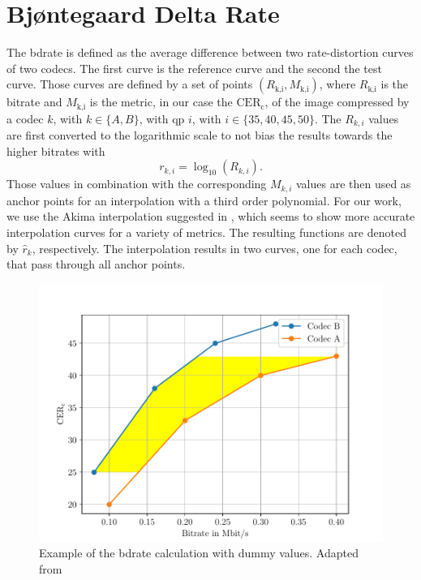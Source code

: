 \section{Bjøntegaard Delta Rate}
\label{subsec:bdrate}

The \gls{bdrate} \cite{bdrate_original_2001}\cite{bdrate_beyond_2022} is defined as the average difference between two rate-distortion curves of two codecs.
The first curve is the reference curve and the second the test curve.
Those curves are defined by a set of points $(R_{\text{k,i}}, M_{\text{k,i}})$, where $R_{\text{k,i}}$ is the bitrate and $M_{\text{k,i}}$ is the metric, in our case the $\text{CER}_{\text{c}}$, of the image compressed by a codec $k$, with $k \in \{A,B\}$, with \gls{qp} $i$, with $i \in \{35,40,45,50\}$.
The $R_{k,i}$ values are first converted to the logarithmic scale to not bias the results towards the higher bitrates with
\begin{equation}
    r_{k,i} = \log_{10}\left(R_{k,i}\right).
    \label{eq:log_scale}
\end{equation}
Those values in combination with the corresponding $M_{k,i}$ values are then used as anchor points for an interpolation with a third order polynomial.
For our work, we use the Akima interpolation suggested in \cite{bdrate_beyond_2022}, which seems to show more accurate interpolation curves for a variety of metrics.
The resulting functions are denoted by $\hat{r}_{k}$, respectively.
The interpolation results in two curves, one for each codec, that pass through all anchor points.
\begin{figure}
    \centering
    \includegraphics[width=\textwidth]{../../images/bjontegaard_example.pdf}
    \caption{Example of the \gls{bdrate} calculation with dummy values. Adapted from \cite{bdrate_beyond_2022}}
    \label{fig:bdrate_example}
\end{figure}
